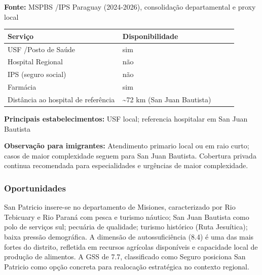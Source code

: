 \textbf{Fonte:} MSPBS /\allowbreak  IPS Paraguay (2024-2026), consolidação
departamental e proxy local

{\def\LTcaptype{none} %
\begin{longtable}{@{}>{\raggedright\arraybackslash}p{0.45\linewidth} >{\raggedright\arraybackslash}p{0.45\linewidth}@{}}
\toprule\noalign{}
Serviço & Disponibilidade \\
\midrule\noalign{}
\endhead
\bottomrule\noalign{}
\endlastfoot
USF /\allowbreak  Posto de Saúde & sim \\
Hospital Regional & não \\
IPS (seguro social) & não \\
Farmácia & sim \\
Distância ao hospital de referência & \textasciitilde72 km (San Juan
Bautista) \\
\end{longtable}
}

\textbf{Principais estabelecimentos:} USF local; referencia hospitalar
em San Juan Bautista

\textbf{Observação para imigrantes:} Atendimento primario local ou em
raio curto; casos de maior complexidade seguem para San Juan Bautista.
Cobertura privada continua recomendada para especialidades e urgências
de maior complexidade.
\newpage

\subsubsection*{Oportunidades}\label{oport-san-patricio-0805}
San Patricio insere-se no departamento de Misiones, caracterizado por Rio Tebicuary e Rio Paraná com pesca e turismo náutico; San Juan Bautista como polo de serviços sul; pecuária de qualidade; turismo histórico (Ruta Jesuítica); baixa pressão demográfica. A dimensão de autossuficiência (8.4) é uma das mais fortes do distrito, refletida em recursos agrícolas disponíveis e capacidade local de produção de alimentos. A GSS de 7.7, classificado como Seguro posiciona San Patricio como opção concreta para realocação estratégica no contexto regional.

